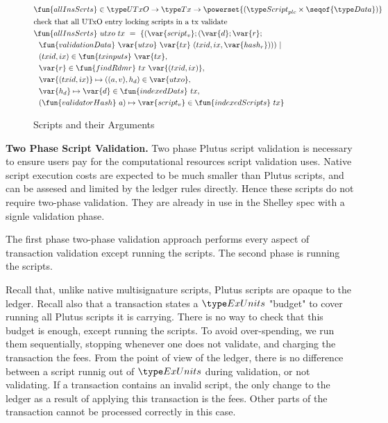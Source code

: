 \begin{figure}[htb]
  \begin{align*}
    & \fun{allInsScrts} \in \UTxO \to \Tx \to \powerset{(\ScriptPlutus\times\seqof{\Data})} \\
    & \text{check that all UTxO entry locking scripts in a tx validate} \\
    & \fun{allInsScrts}~{utxo}~{tx}~=~ \{ (\var{script_v}; (\var{d};\var{r}; \\
    & ~~ \fun{validationData}~\var{utxo}~\var{tx}~
      (txid,ix,\var{hash_r}))) ~\vert \\
    & ~~(txid,ix) \in \fun{txinputs}~\var{tx}, \\
    & ~~\var{r} \in \fun{findRdmr}~{tx}~\var{(txid,ix)}, \\
    & ~~\var{(txid,ix)} \mapsto ((a,v),h_d) \in \var{utxo}, \\
    & ~~\var{h_d}\mapsto \var{d} \in \fun{indexedDats}~{tx}, \\
    & ~~(\fun{validatorHash}~{a})\mapsto \var{script_v}\in \fun{indexedScripts}~{tx} \}
  \end{align*}
  \caption{Scripts and their Arguments}
  \label{fig:functions:script3}
\end{figure}

\textbf{Two Phase Script Validation.}
Two phase Plutus script validation is necessary to ensure users pay for the
computational resources script validation uses.
Native script execution costs are expected to be much smaller than Plutus
scripts, and can be assesed and limited by the ledger rules directly.
Hence these scripts do not require two-phase validation. They are already
in use in the Shelley spec with a signle validation phase.

The first phase two-phase validation approach
performs every aspect of transaction validation except running the scripts.
The second phase is running the scripts.

Recall that, unlike native
multisignature scripts, Plutus scripts are opaque to the ledger. Recall also
that a transaction states a $\ExUnits$ "budget" to cover running all Plutus
scripts it is carrying. There is no way to check that this budget is enough,
except running the scripts. To avoid over-spending, we run them sequentially,
stopping whenever one does not validate, and charging the transaction the
fees. From the point of view of the ledger, there is no difference
between a script runnig out of $\ExUnits$ during validation, or not validating.
If a transaction contains an invalid script, the only change to the ledger
as a result of applying this transaction is the fees. Other parts of
the transaction cannot be processed correctly in this case.

